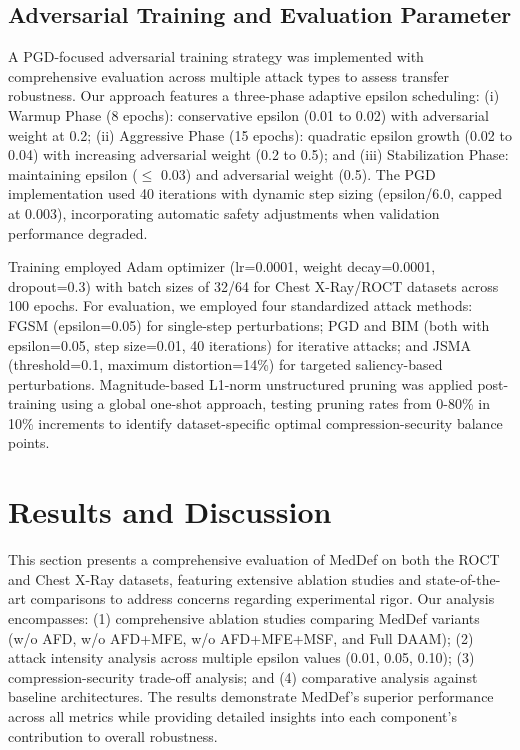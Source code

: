\documentclass[preprint,12pt]{elsarticle}
\begin{document}
\subsection{Adversarial Training and Evaluation Parameter}
A PGD-focused adversarial training strategy was implemented with comprehensive evaluation across multiple attack types to assess transfer robustness. Our approach features a three-phase adaptive epsilon scheduling: (i) Warmup Phase (8 epochs): conservative epsilon (0.01 to 0.02) with adversarial weight at 0.2; (ii) Aggressive Phase (15 epochs): quadratic epsilon growth (0.02 to 0.04) with increasing adversarial weight (0.2 to 0.5); and (iii) Stabilization Phase: maintaining epsilon ($\leq$ 0.03) and adversarial weight (0.5). The PGD implementation used 40 iterations with dynamic step sizing (epsilon/6.0, capped at 0.003), incorporating automatic safety adjustments when validation performance degraded.

Training employed Adam optimizer (lr=0.0001, weight decay=0.0001, dropout=0.3) with batch sizes of 32/64 for Chest X-Ray/ROCT datasets across 100 epochs. For evaluation, we employed four standardized attack methods: FGSM (epsilon=0.05) for single-step perturbations; PGD and BIM (both with epsilon=0.05, step size=0.01, 40 iterations) for iterative attacks; and JSMA (threshold=0.1, maximum distortion=14\%) for targeted saliency-based perturbations. Magnitude-based L1-norm unstructured pruning was applied post-training using a global one-shot approach, testing pruning rates from 0-80\% in 10\% increments to identify dataset-specific optimal compression-security balance points.

\section{Results and Discussion}
\label{sec:results}

This section presents a comprehensive evaluation of MedDef on both the ROCT and Chest X-Ray datasets, featuring extensive ablation studies and state-of-the-art comparisons to address concerns regarding experimental rigor. Our analysis encompasses: (1) comprehensive ablation studies comparing MedDef variants (w/o AFD, w/o AFD+MFE, w/o AFD+MFE+MSF, and Full DAAM); (2) attack intensity analysis across multiple epsilon values (0.01, 0.05, 0.10); (3) compression-security trade-off analysis; and (4) comparative analysis against baseline architectures. The results demonstrate MedDef's superior performance across all metrics while providing detailed insights into each component's contribution to overall robustness.
\end{document}
